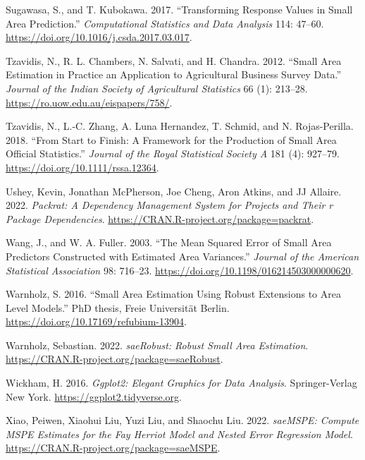 \begin{CSLReferences}{1}{0}
\leavevmode{}%
Sugawasa, S., and T. Kubokawa. 2017. {``Transforming Response Values in Small Area Prediction.''} \emph{Computational Statistics and Data Analysis} 114: 47--60. \url{https://doi.org/10.1016/j.csda.2017.03.017}.

\leavevmode{}%
Tzavidis, N., R. L. Chambers, N. Salvati, and H. Chandra. 2012. {``Small Area Estimation in Practice an Application to Agricultural Business Survey Data.''} \emph{Journal of the Indian Society of Agricultural Statistics} 66 (1): 213--28. \url{https://ro.uow.edu.au/eispapers/758/}.

\leavevmode{}%
Tzavidis, N., L.-C. Zhang, A. Luna Hernandez, T. Schmid, and N. Rojas-Perilla. 2018. {``From Start to Finish: A Framework for the Production of Small Area Official Statistics.''} \emph{Journal of the Royal Statistical Society A} 181 (4): 927--79. \url{https://doi.org/10.1111/rssa.12364}.

\leavevmode{}%
Ushey, Kevin, Jonathan McPherson, Joe Cheng, Aron Atkins, and JJ Allaire. 2022. \emph{Packrat: A Dependency Management System for Projects and Their r Package Dependencies}. \url{https://CRAN.R-project.org/package=packrat}.

\leavevmode{}%
Wang, J., and W. A. Fuller. 2003. {``The Mean Squared Error of Small Area Predictors Constructed with Estimated Area Variances.''} \emph{Journal of the American Statistical Association} 98: 716--23. \url{https://doi.org/10.1198/016214503000000620}.

\leavevmode{}%
Warnholz, S. 2016. {``Small Area Estimation Using Robust Extensions to Area Level Models.''} PhD thesis, Freie Universität Berlin. \url{https://doi.org/10.17169/refubium-13904}.

\leavevmode{}%
Warnholz, Sebastian. 2022. \emph{saeRobust: Robust Small Area Estimation}. \url{https://CRAN.R-project.org/package=saeRobust}.

\leavevmode{}%
Wickham, H. 2016. \emph{Ggplot2: Elegant Graphics for Data Analysis}. Springer-Verlag New York. \url{https://ggplot2.tidyverse.org}.

\leavevmode{}%
Xiao, Peiwen, Xiaohui Liu, Yuzi Liu, and Shaochu Liu. 2022. \emph{saeMSPE: Compute {MSPE} Estimates for the Fay Herriot Model and Nested Error Regression Model}. \url{https://CRAN.R-project.org/package=saeMSPE}.


\end{CSLReferences}
